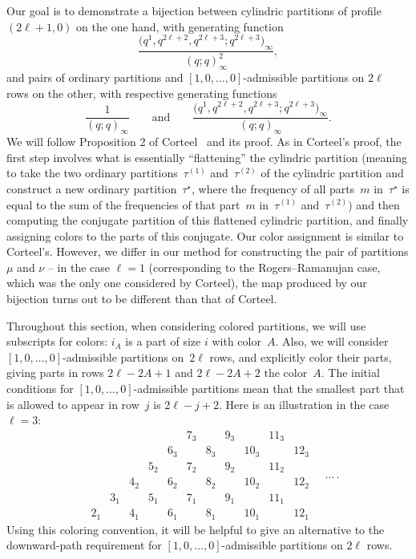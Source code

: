 \documentclass[10pt,a4paper]{amsart}
\numberwithin{equation}{section}
\theoremstyle{definition}
\begin{document}
Our goal is to demonstrate a bijection between cylindric partitions of profile $(2\ell+1,0)$ on the one hand, with generating function
\[\frac{\bigl(q^1,q^{2\ell+2},q^{2\ell+3};q^{2\ell+3}\bigr)_\infty}{(q;q)_\infty ^2},\]
and pairs of ordinary partitions and $[1,0,\dots,0]$-admissible partitions on $2\ell$ rows on the other, with respective generating functions
\[ \frac{1}{(q;q)_\infty} \qquad \text{and} \qquad \frac{\bigl(q^1,q^{2\ell+2},q^{2\ell+3};q^{2\ell+3}\bigr)_\infty}{(q;q)_\infty}.\] We will follow Proposition 2 of Corteel~\cite{Cort} and its proof. As in Corteel's proof, the first step involves what is essentially ``flattening'' the cylindric partition (meaning to take the two ordinary partitions~$\tau^{(1)}$ and~$\tau^{(2)}$ of the cylindric partition and construct a new ordinary partition~$\tau^{\star}$, where the frequency of all parts~$m$ in~$\tau^{\star}$ is equal to the sum of the frequencies of that part~$m$ in~$\tau^{(1)}$ and~$\tau^{(2)}$) and then computing the conjugate partition of this flattened cylindric partition, and finally assigning colors to the parts of this conjugate. Our color assignment is similar to Corteel's. However, we differ in our method for constructing the pair of partitions $\mu$ and $\nu$ -- in the case $\ell=1$ (corresponding to the Rogers--Ramanujan case, which was the only one considered by Corteel), the map produced by our bijection turns out to be different than that of Corteel.

Throughout this section, when considering colored partitions, we will use subscripts for colors: $i_A$ is a part of size $i$ with color~$A$. Also, we will consider $[1,0,\dots,0]$-admissible partitions on~$2\ell$ rows, and explicitly color their parts, giving parts in rows $2\ell-2A+1$ and $2\ell-2A+2$ the color~$A$. The initial conditions for $[1,0,\dots,0]$-admissible partitions mean that the smallest part that is allowed to appear in row~$j$ is $2\ell-j+2$. Here is an illustration in the case $\ell=3$:
\begin{equation*}
\begin{matrix}
 && && && 7_3 && 9_3 && 11_3 & \\
& && && 6_3 && 8_3 && 10_3 && 12_3\\
 && && 5_2 && 7_2 && 9_2 && 11_2 & \\
& && 4_2 && 6_2 && 8_2 && 10_2 && 12_2\\
 && 3_1 && 5_1 && 7_1 && 9_1 && 11_1 & \\
& 2_1 && 4_1 && 6_1 && 8_1 && 10_1 && 12_1
 \end{matrix}\quad\dots\, .
\end{equation*}
Using this coloring convention, it will be helpful to give an alternative to the downward-path requirement for $[1,0,\dots,0]$-admissible partitions on $2\ell$ rows.
\end{document}
